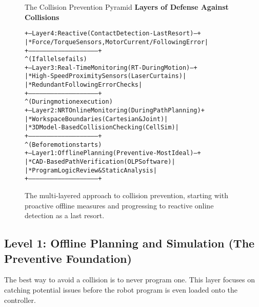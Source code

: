 \begin{figure}[h!]
    \centering
    \begin{infobox}{The Collision Prevention Pyramid}
        \textbf{Layers of Defense Against Collisions}
        {\footnotesize
        \begin{alltt}
     +-- Layer 4: Reactive (Contact Detection - Last Resort) --+
     | * Force/Torque Sensors, Motor Current/Following Error   |
     +---------------------------------------------------------+
                           ^ (If all else fails)
     +-- Layer 3: Real-Time Monitoring (RT - During Motion) ---+
     | * High-Speed Proximity Sensors (Laser Curtains)         |
     | * Redundant Following Error Checks                      |
     +---------------------------------------------------------+
                           ^ (During motion execution)
     +-- Layer 2: NRT Online Monitoring (During Path Planning) +
     | * Workspace Boundaries (Cartesian & Joint)              |
     | * 3D Model-Based Collision Checking (Cell Sim)          |
     +---------------------------------------------------------+
                           ^ (Before motion starts)
     +-- Layer 1: Offline Planning (Preventive - Most Ideal) --+
     | * CAD-Based Path Verification (OLP Software)            |
     | * Program Logic Review & Static Analysis                |
     +---------------------------------------------------------+
        \end{alltt}
        }
    \end{infobox}
    \caption{The multi-layered approach to collision prevention, starting with proactive offline measures and progressing to reactive online detection as a last resort.}
            \vspace{0.3cm}
    \label{fig:collision_pyramid}
\end{figure}

\subsection{Level 1: Offline Planning and Simulation (The Preventive Foundation)}
\label{subsec:offline_collision_prevention}
The best way to avoid a collision is to never program one. This layer focuses on catching potential issues before the robot program is even loaded onto the controller.

